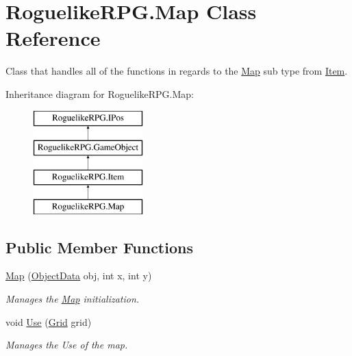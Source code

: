 \hypertarget{class_roguelike_r_p_g_1_1_map}{}\section{Roguelike\+R\+P\+G.\+Map Class Reference}
\label{class_roguelike_r_p_g_1_1_map}


Class that handles all of the functions in regards to the \mbox{\hyperlink{class_roguelike_r_p_g_1_1_map}{Map}} sub type from \mbox{\hyperlink{class_roguelike_r_p_g_1_1_item}{Item}}.  


Inheritance diagram for Roguelike\+R\+P\+G.\+Map\+:\begin{figure}[H]
\begin{center}
\leavevmode
\includegraphics[height=4.000000cm]{class_roguelike_r_p_g_1_1_map}
\end{center}
\end{figure}
\subsection*{Public Member Functions}
\begin{DoxyCompactItemize}
\item 
\mbox{\hyperlink{class_roguelike_r_p_g_1_1_map_abaf4fc0e21d2f056464fb0e35d9cb14c}{Map}} (\mbox{\hyperlink{struct_roguelike_r_p_g_1_1_object_data}{Object\+Data}} obj, int x, int y)
\begin{DoxyCompactList}\small\item\em Manages the \mbox{\hyperlink{class_roguelike_r_p_g_1_1_map}{Map}} initialization. \end{DoxyCompactList}\item 
void \mbox{\hyperlink{class_roguelike_r_p_g_1_1_map_a7960c9dc9313df6cf3088578d17a07fa}{Use}} (\mbox{\hyperlink{class_roguelike_r_p_g_1_1_grid}{Grid}} grid)
\begin{DoxyCompactList}\small\item\em Manages the Use of the map. \end{DoxyCompactList}\end{DoxyCompactItemize}
